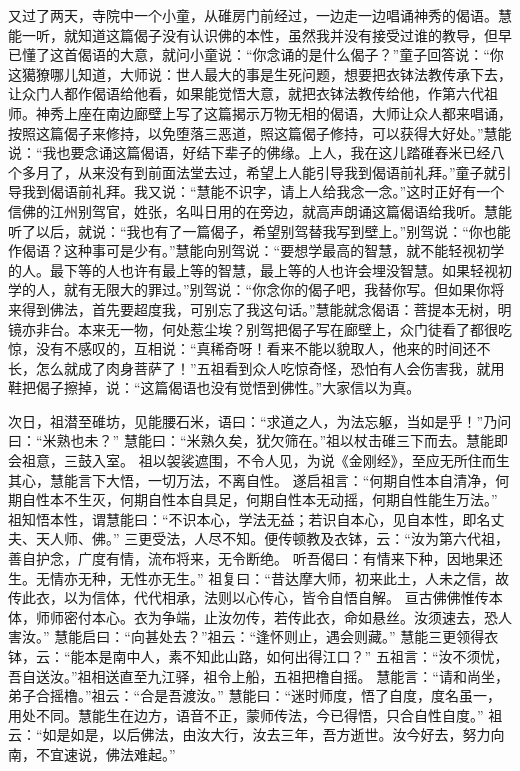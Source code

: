 \documentclass[12pt,twoside,openany]{book}
\newcommand{\kai}[1]{{\CJKfamily{kai}#1}}
\begin{document}
\kai{又过了两天，寺院中一个小童，从碓房门前经过，一边走一边唱诵神秀的偈语。慧能一听，就知道这篇偈子没有认识佛的本性，虽然我并没有接受过谁的教导，但早已懂了这首偈语的大意，就问小童说：“你念诵的是什么偈子？”童子回答说：“你这獦獠哪儿知道，大师说：世人最大的事是生死问题，想要把衣钵法教传承下去，让众门人都作偈语给他看，如果能觉悟大意，就把衣钵法教传给他，作第六代祖师。神秀上座在南边廊壁上写了这篇揭示万物无相的偈语，大师让众人都来唱诵，按照这篇偈子来修持，以免堕落三恶道，照这篇偈子修持，可以获得大好处。”慧能说：“我也要念诵这篇偈语，好结下辈子的佛缘。上人，我在这儿踏碓舂米已经八个多月了，从来没有到前面法堂去过，希望上人能引导我到偈语前礼拜。”童子就引导我到偈语前礼拜。我又说：“慧能不识字，请上人给我念一念。”这时正好有一个信佛的江州别驾官，姓张，名叫日用的在旁边，就高声朗诵这篇偈语给我听。慧能听了以后，就说：“我也有了一篇偈子，希望别驾替我写到壁上。”别驾说：“你也能作偈语？这种事可是少有。”慧能向别驾说：“要想学最高的智慧，就不能轻视初学的人。最下等的人也许有最上等的智慧，最上等的人也许会埋没智慧。如果轻视初学的人，就有无限大的罪过。”别驾说：“你念你的偈子吧，我替你写。但如果你将来得到佛法，首先要超度我，可别忘了我这句话。”慧能就念偈语：菩提本无树，明镜亦非台。本来无一物，何处惹尘埃？别驾把偈子写在廊壁上，众门徒看了都很吃惊，没有不感叹的，互相说：“真稀奇呀！看来不能以貌取人，他来的时间还不长，怎么就成了肉身菩萨了！”五祖看到众人吃惊奇怪，恐怕有人会伤害我，就用鞋把偈子擦掉，说：“这篇偈语也没有觉悟到佛性。”大家信以为真。}

次日，祖潜至碓坊，见能腰石米，语曰：“求道之人，为法忘躯，当如是乎！”乃问曰：“米熟也未？”
慧能曰：“米熟久矣，犹欠筛在。”祖以杖击碓三下而去。慧能即会祖意，三鼓入室。
祖以袈裟遮围，不令人见，为说《金刚经》，至应无所住而生其心，慧能言下大悟，一切万法，不离自性。
遂启祖言：“{\color{red}何期自性本自清净，何期自性本不生灭，何期自性本自具足，何期自性本无动摇，何期自性能生万法。}”
祖知悟本性，谓慧能曰：“不识本心，学法无益；若识自本心，见自本性，即名丈夫、天人师、佛。”
三更受法，人尽不知。便传顿教及衣钵，云：“汝为第六代祖，善自护念，广度有情，流布将来，无令断绝。
听吾偈曰：有情来下种，因地果还生。无情亦无种，无性亦无生。”
祖复曰：“昔达摩大师，初来此土，人未之信，故传此衣，以为信体，代代相承，法则以心传心，皆令自悟自解。
亘古佛佛惟传本体，师师密付本心。衣为争端，止汝勿传，若传此衣，命如悬丝。汝须速去，恐人害汝。”
慧能启曰：“向甚处去？”祖云：“逢怀则止，遇会则藏。”
慧能三更领得衣钵，云：“能本是南中人，素不知此山路，如何出得江口？”
五祖言：“汝不须忧，吾自送汝。”祖相送直至九江驿，祖令上船，五祖把橹自摇。
慧能言：“请和尚坐，弟子合摇橹。”祖云：“合是吾渡汝。”
慧能曰：“迷时师度，悟了自度，度名虽一，用处不同。慧能生在边方，语音不正，蒙师传法，今已得悟，只合自性自度。”
祖云：“如是如是，以后佛法，由汝大行，汝去三年，吾方逝世。汝今好去，努力向南，不宜速说，佛法难起。”
\end{document}
